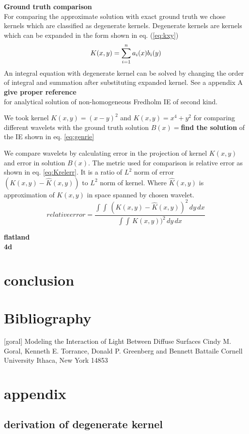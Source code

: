 \documentclass[12pt]{article}
\begin{document}
{\bf Ground truth comparison}\\
For comparing the approximate solution with exact ground truth we chose kernels which are classified as degenerate kernels. Degenerate kernels are kernels which can be expanded in the form shown in eq. (\ref{eq:kxy})
\begin{equation} \label{eq:kxy}
K(x,y) = \sum\limits_{i=1}^na_i(x)b_i(y) \\ 
\end{equation}
An integral equation with degenerate kernel can be solved by changing the order of integral and summation after substituting expanded kernel. See a
appendix A\\

{\bf give proper reference}\\
for analytical solution of non-homogeneous Fredholm IE of second kind. 

We took kernel $K(x,y)=(x-y)^2$ and $K(x,y)=x^4+y^2$ for comparing different wavelets with the ground truth solution $B(x)=${\bf find the solution} of the IE shown in eq. \ref{eq:genrie}

We compare wavelets by calculating error in the projection of kernel $K(x,y)$ and error in solution $B(x)$. The metric used for comparison is relative error as shown in eq. \ref{eq:Krelerr}. It is a ratio of $L^2$ norm of error $(K(x,y)-\hat{K}(x,y))$ to $L^2$ norm of kernel. Where $\hat{K}(x,y)$ is approximation of $K(x,y)$ in space spanned by chosen wavelet.
\begin{equation} \label{eq:Krelerr}
relative  error=\frac{\int\int \,(K(x,y)-\hat{K}(x,y))^2  \,dy \, dx}{\int\int \,K(x,y))^2  \,dy \, dx}
\end{equation}

{\bf flatland}\\

{\bf 4d}\\


\section{conclusion}
\section{Bibliography}
[goral] Modeling the Interaction of Light Between Diffuse Surfaces
Cindy M. Goral, Kenneth E. Torrance, Donald P. Greenberg and Bennett Battaile
Cornell University
Ithaca, New York 14853 \\
\section{appendix}
\subsection{derivation of degenerate kernel}
\end{document}
